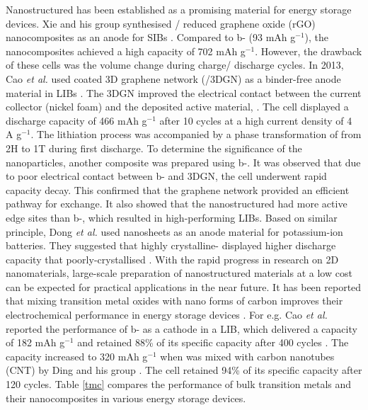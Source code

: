 Nanostructured  has been established as a promising material for energy storage devices. Xie and his group synthesised / reduced graphene oxide (rGO) nanocomposites as an anode for SIBs \cite{xie_mos2/graphene_2015}. Compared to b- (93 mAh g$^{-1}$), the nanocomposites achieved a high capacity of 702 mAh g$^{-1}$. However, the drawback of these cells was the volume change during charge/ discharge cycles. In 2013, Cao \textit{et al.} used  coated 3D graphene network (/3DGN) as a binder-free anode material in LIBs \cite{cao_preparation_2013}. The 3DGN improved the electrical contact between the current collector (nickel foam) and the deposited active material, . The cell displayed a discharge capacity of 466 mAh g$^{-1}$ after 10 cycles at a  high current density of 4 A g$^{-1}$. The lithiation process was accompanied by a phase transformation of  from 2H to 1T during first discharge. To determine the significance of the  nanoparticles, another composite was prepared using b-. It was observed that due to poor electrical contact between b- and 3DGN, the cell underwent rapid capacity decay. This confirmed that the graphene network provided an efficient pathway for  exchange. It also showed that the nanostructured  had more active edge sites than b-, which resulted in high-performing LIBs. Based on similar principle, Dong \textit{et al.} used  nanosheets as an anode material for potassium-ion batteries. They suggested that highly crystalline- displayed higher discharge capacity that poorly-crystallised  \cite{dong_insights_2019}. With the rapid progress in research on 2D nanomaterials, large-scale preparation of nanostructured materials at a low cost can be expected for practical applications in the near future. It has been reported that mixing transition metal oxides with nano forms of carbon improves their electrochemical performance in energy storage devices \cite{acerce_metallic_2015-1, zhao_flexible_2015,hu_hierarchical_2015,cao_preparation_2013,ding_facile_2012}. For e.g. Cao \textit{et al.} reported the performance of b- as a cathode in a LIB, which delivered a capacity of 182 mAh g$^{-1}$ and retained 88\% of its specific capacity after 400 cycles \cite{cao_preparation_2013}. The capacity increased to 320 mAh g$^{-1}$ when  was mixed with carbon nanotubes (CNT) by Ding and his group \cite{ding_facile_2012}. The cell retained 94\% of its specific capacity after 120 cycles. Table \ref{tmc} compares the performance of bulk transition metals and their nanocomposites in various energy storage devices. 

